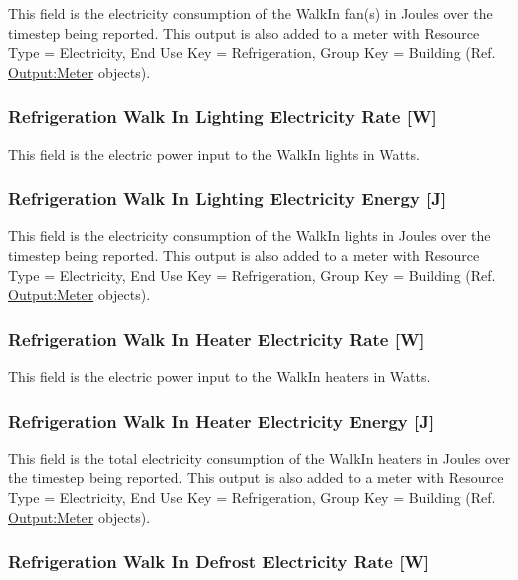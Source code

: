 This field is the electricity consumption of the WalkIn fan(s) in Joules over the timestep being reported. This output is also added to a meter with Resource Type = Electricity, End Use Key = Refrigeration, Group Key = Building (Ref. \hyperref[outputmeter-and-outputmetermeterfileonly]{Output:Meter} objects).

\subsubsection{Refrigeration Walk In Lighting Electricity Rate {[}W{]}}\label{refrigeration-walk-in-lighting-electric-power-w}

This field is the electric power input to the WalkIn lights in Watts.

\subsubsection{Refrigeration Walk In Lighting Electricity Energy {[}J{]}}\label{refrigeration-walk-in-lighting-electric-energy-j}

This field is the electricity consumption of the WalkIn lights in Joules over the timestep being reported. This output is also added to a meter with Resource Type = Electricity, End Use Key = Refrigeration, Group Key = Building (Ref. \hyperref[outputmeter-and-outputmetermeterfileonly]{Output:Meter} objects).

\subsubsection{Refrigeration Walk In Heater Electricity Rate {[}W{]}}\label{refrigeration-walk-in-heater-electric-power-w}

This field is the electric power input to the WalkIn heaters in Watts.

\subsubsection{Refrigeration Walk In Heater Electricity Energy {[}J{]}}\label{refrigeration-walk-in-heater-electric-energy-j}

This field is the total electricity consumption of the WalkIn heaters in Joules over the timestep being reported. This output is also added to a meter with Resource Type = Electricity, End Use Key = Refrigeration, Group Key = Building (Ref. \hyperref[outputmeter-and-outputmetermeterfileonly]{Output:Meter} objects).

\subsubsection{Refrigeration Walk In Defrost Electricity Rate {[}W{]}}\label{refrigeration-walk-in-defrost-electric-power-w}

